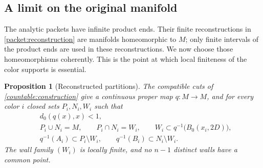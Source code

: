 \documentclass[11pt]{article}
\numberwithin{equation}{section}
\newtheorem{proposition}[theorem]{Proposition}
\theoremstyle{definition}
\theoremstyle{remark}
\begin{document}
\subsection{A limit on the original manifold}

The analytic packets have infinite product ends.  Their finite
reconstructions in \cref{packet:reconstruction} are manifolds
homeomorphic to $M$; only finite intervals of the product ends are used
in these reconstructions.  We now choose those homeomorphisms
coherently.  This is the point at which local finiteness of the color
supports is essential.

\begin{proposition}[Reconstructed partitions]\label{topology:partitions}
The compatible cuts of \cref{countable:construction} give a continuous
proper map $q:M\to M$, and for every color $i$ closed sets $P_i,N_i,W_i$
such that
\begin{align}
 &d_0(q(x),x)<1,\label{topology:displacement}\\
 &P_i\cup N_i=M,\qquad P_i\cap N_i=W_i,
   \qquad W_i\subset q^{-1}\bigl(B_0(x_i,2D)\bigr),
   \label{topology:sides}\\
 &q^{-1}(A_i)\subset P_i\setminus W_i,
   \qquad q^{-1}(B_i)\subset N_i\setminus W_i.
   \label{topology:forced}
\end{align}
The wall family $(W_i)$ is locally finite, and no $n-1$ distinct walls
have a common point.
\end{proposition}
\end{document}
